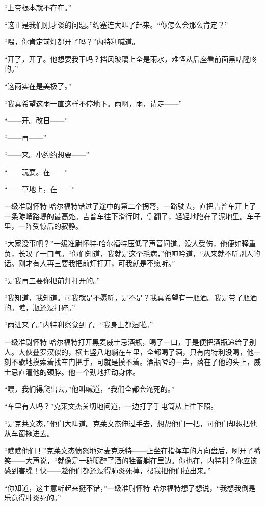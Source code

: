     “上帝根本就不存在。”

    “这正是我们刚才谈的问题。”约塞连大叫了起来。“你怎么会那么肯定？”

    “喂，你肯定前灯都开了吗？”内特利喊道。

    “开了，开了。他想要我干吗？挡风玻璃上全是雨水，难怪从后座看前面黑咕隆咚的。”

    “这雨实在是美极了。”

    “我真希望这雨一直这样不停地下。雨啊，雨，请走——”

    “——开。改日——”

    “——再——”

    “——来。小约约想要——”

    “——玩耍。在——”

    “——草地上，在——”

    一级准尉怀特-哈尔福特错过了途中的第二个拐弯，一路驶去，直把吉普车开上了一条陡峭路堤的最高处。吉普车往下滑行时，侧翻了，轻轻地陷在了泥地里。车子里，一阵受惊后的寂静。

    “大家没事吧？”一级准尉怀特-哈尔福特压低了声音问道。没人受伤，他便如释重负，长叹了一口气。“你们知道，我就是这个毛病，”他呻吟道，“从来就不听别人的话。刚才有人再三要我把前灯打开，可我就是不愿听。”

    “是我再三要你把前灯打开的。”

    “我知道，我知道。可我就是不愿听，是不是？我真希望有一瓶酒。我是带了瓶酒的。瞧，瓶还没打碎。”

    “雨进来了。”内特利察觉到了。“我身上都湿啦。”

    一级准尉怀特-哈尔福特打开黑麦威士忌酒瓶，喝了一口，于是便把酒瓶递给了别人。大伙叠罗汉似的，横七竖八地躺在车里，全都喝了酒，只有内特利没喝，他一刻不歇地摸索着找车门把手，可就是摸不着。酒瓶噔的一声，落在了他的头上，威士忌直灌他的颈脖。他一个劲地扭动身体。

    “喂，我们得爬出去，”他叫喊道，“我们全都会淹死的。”

    “车里有人吗？”克莱文杰关切地问道，一边打了手电筒从上往下照。

    “是克莱文杰，”他们大叫道。克莱文杰伸过手去，想帮他们一把，可他们却想把他从车窗拖进去。

    “瞧瞧他们！”克莱文杰愤怒地对麦克沃特——正坐在指挥车的方向盘后，咧开了嘴笑——大声说，“就像是一群喝醉了酒的牲畜躺在里边。你也在，内特利？你应该感到害臊！快——趁他们都还没得肺炎死掉，帮我把他们拉出来。”

    “你知道，这主意听起来挺不错，”一级准尉怀特-哈尔福特想了想说，“我想我倒是乐意得肺炎死的。”

